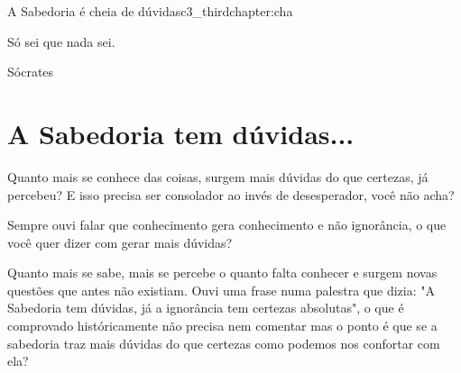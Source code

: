 


\begin{chapterpage}{A Sabedoria é cheia de dúvidas}{c3_thirdchapter:cha}

\begin{myquotation}Só sei que nada sei.\par\vspace*{15mm}
\mbox{}\hfill \emdash{}Sócrates
\par\end{myquotation}

\end{chapterpage}


\section{A Sabedoria tem dúvidas...}\label{c1_images:sec}

\emdash{}Quanto mais se conhece das coisas, surgem mais dúvidas do que certezas, já percebeu? E isso precisa ser consolador ao invés de desesperador, você não acha?

\emdash{}Sempre ouvi falar que conhecimento gera conhecimento e não ignorância, o que você quer dizer com gerar mais dúvidas?

\emdash{}Quanto mais se sabe, mais se percebe o quanto falta conhecer e surgem novas questões que antes não existiam. Ouvi uma frase numa palestra que dizia: "A Sabedoria tem dúvidas, já a ignorância tem certezas absolutas", o que é comprovado históricamente não precisa nem comentar mas o ponto é que se a sabedoria traz mais dúvidas do que certezas como podemos nos confortar com ela?


